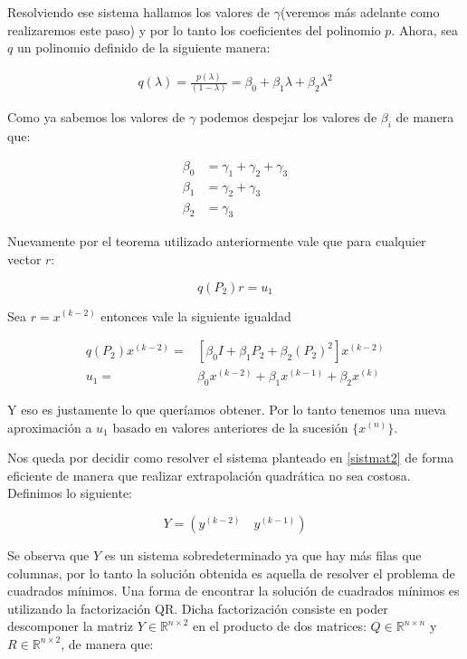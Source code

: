 Resolviendo ese sistema hallamos los valores de $\gamma$(veremos m\'as adelante como realizaremos este paso) y por lo tanto los coeficientes del polinomio $p$. Ahora, sea $q$ un polinomio definido de la siguiente manera:

\begin{align}
	q(\lambda) = \frac{p(\lambda)}{(1-\lambda)} = \beta_{0} + \beta_{1}\lambda + \beta_{2}\lambda^{2} \label{polq}
\end{align}

Como ya sabemos los valores de $\gamma$ podemos despejar los valores de $\beta_{i}$ de manera que:

\begin{align*}
	\beta_{0} &= \gamma_{1} + \gamma_{2} + \gamma_{3} \\
	\beta_{1} &= \gamma_{2} + \gamma_{3} \\
	\beta_{2} &= \gamma_{3}
\end{align*}

Nuevamente por el teorema utilizado anteriormente vale que para cualquier vector $r$:

\[
	q(P_{2})r = u_{1}
\]

Sea $r = x^{(k-2)}$ entonces vale la siguiente igualdad

\begin{align*}
	q(P_{2})x^{(k-2)} =& [\beta_{0}I + \beta_{1}P_{2} + \beta_{2}(P_{2})^{2}]x^{(k-2)}\\
	u_{1} =& \beta_{0}x^{(k-2)} + \beta_{1}x^{(k-1)} + \beta_{2}x^{(k)}
\end{align*}

Y eso es justamente lo que quer\'iamos obtener. Por lo tanto tenemos una nueva aproximaci\'on a $u_{1}$ basado en valores anteriores de la sucesi\'on $\{x^{(n)}\}$.

Nos queda por decidir como resolver el sistema planteado en \eqref{sistmat2} de forma eficiente de manera que realizar extrapolaci\'on quadr\'atica no sea costosa. Definimos lo siguiente:

\[
	Y = \left(y^{(k-2)} \quad y^{(k-1)}\right)
\]


Se observa que $Y$ es un sistema sobredeterminado ya que hay m\'as filas que columnas, por lo tanto la soluci\'on obtenida es aquella de resolver el problema de cuadrados m\'inimos. Una forma de encontrar la soluci\'on de cuadrados m\'inimos es utilizando la factorizaci\'on QR. Dicha factorizaci\'on consiste en poder descomponer la matriz $Y \in \mathbb{R}^{n \times 2}$ en el producto de dos matrices: $Q\in \mathbb{R}^{n \times n}$ y $R\in \mathbb{R}^{n \times 2}$, de manera que:

